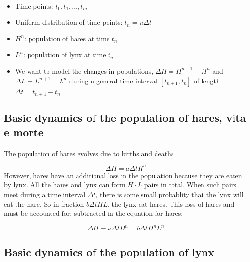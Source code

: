 \documentclass[%
oneside,                 %
final,                   %
10pt]{article}
\begin{document}
\paragraph{}
\begin{itemize}
 \item Time points: $t_0,t_1,\ldots,t_m$

 \item Uniform distribution of time points: $t_n=n\Delta t$

 \item $H^n$: population of hares at time $t_n$

 \item $L^n$: population of lynx at time $t_n$

 \item We want to model the changes in populations, $\Delta H=H^{n+1}-H^n$
   and $\Delta L=L^{n+1}-L^n$ during a general time interval $[t_{n+1},t_n]$
   of length $\Delta t=t_{n+1}-t_n$
\end{itemize}

\noindent



\subsection*{Basic dynamics of the population of hares, vita e morte}


\paragraph{}
The population of hares evolves due to births and deaths

\[
\Delta H = a \Delta t H^n
\]
However, hares have an additional loss in the population because
they are eaten by lynx.
All the hares and lynx can form
$H\cdot L$ pairs in total. When such pairs meet during a time
interval $\Delta t$, there is some
small probablity that the lynx will eat the hare.
So in fraction $b\Delta t HL$, the lynx eat hares. This
loss of hares and must be accounted for:
subtracted in the equation for hares:

\[ \Delta H = a\Delta t H^n - b \Delta t H^nL^n\]



\subsection*{Basic dynamics of the population of lynx}
\end{document}

